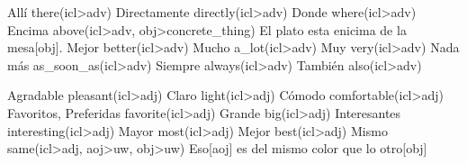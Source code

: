 \documentclass{article}
\begin{document}
{
    \uw
    {Allí}
    {there(icl>adv)}
    {}
    \uw
    {Directamente}
    {directly(icl>adv)}
    {}
    \uw
    {Donde}
    {where(icl>adv)}
    {}
    \uw
    {Encima}
    {above(icl>adv, obj>concrete\_thing)}
    {El plato esta enicima de la mesa[obj].}
    \uw
    {Mejor}
    {better(icl>adv)}
    {}
    \uw
    {Mucho}
    {a\_lot(icl>adv)}
    {}
    \uw
    {Muy}
    {very(icl>adv)}
    {}
    \uw
    {Nada más}
    {as\_soon\_as(icl>adv)}
    {}
    \uw
    {Siempre}
    {always(icl>adv)}
    {}
    \uw
    {También}
    {also(icl>adv)}
    {}
}

{
    \uw
    {Agradable}
    {pleasant(icl>adj)}
    {}
    \uw
    {Claro}
    {light(icl>adj)}
    {}
    \uw
    {Cómodo}
    {comfortable(icl>adj)}
    {}
    \uw
    {Favoritos, Preferidas}
    {favorite(icl>adj)}
    {}
    \uw
    {Grande}
    {big(icl>adj)}
    {}
    \uw
    {Interesantes}
    {interesting(icl>adj)}
    {}
    \uw
    {Mayor}
    {most(icl>adj)}
    {}
    \uw
    {Mejor}
    {best(icl>adj)}
    {}
    \uw
    {Mismo}
    {same(icl>adj, aoj>uw, obj>uw)}
    {Eso[aoj] es del mismo color que lo otro[obj]}
}
\end{document}
